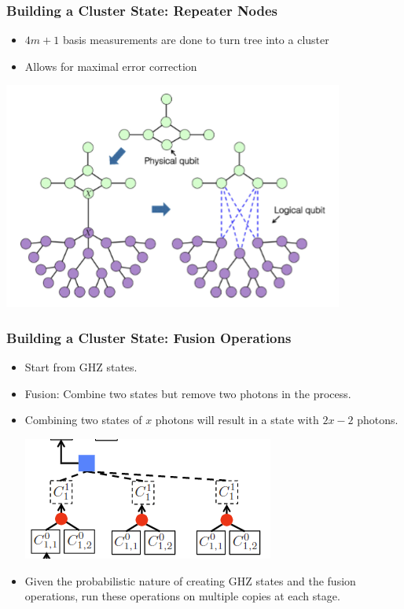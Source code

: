 \documentclass[aspectratio=169,xcolor=dvipsnames]{beamer}
\begin{document}
\begin{frame}
    \frametitle{Building a Cluster State: Repeater Nodes}
    \begin{itemize}
        \item $4m+1$ basis measurements are done to turn tree into a cluster
        \item Allows for maximal error correction
    \end{itemize}
    \begin{center}
        \includegraphics[width=0.5\linewidth]{figs/measurement.png}
    \end{center}
    \end{frame}
\begin{frame}
\frametitle{Building a Cluster State: Fusion Operations}
\begin{itemize}
    \item Start from GHZ states.
    \item Fusion: Combine two states but remove two photons in the process.
    \item Combining two states of $x$ photons will result in a state with $2x-2$ photons.
    \begin{center}
        \includegraphics[width=0.4\linewidth]{figs/mult_attempts.png}
    \end{center}
    \item Given the probabilistic nature of creating GHZ states and the fusion operations, run these operations on multiple copies at each stage.
\end{itemize}
\end{frame}
\end{document}
